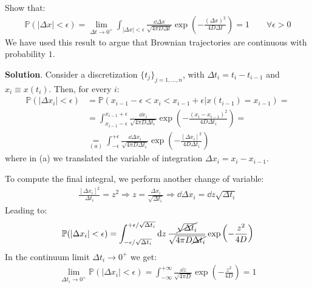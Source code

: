 \documentclass[../template.tex]{subfiles}
\begin{document}
\begin{exo}
    Show that:
    \begin{align*}
        \mathbb{P}(|\Delta x| < \epsilon) = \lim_{\Delta t \to 0^+} \int_{|\Delta x| < \epsilon } \frac{\dd{\Delta x}}{\sqrt{4 \pi D \Delta t }} \exp\left(-\frac{(\Delta x)^2}{4D \Delta t} \right)=1 \qquad \forall \epsilon> 0 
    \end{align*}
    We have used this result to argue that Brownian trajectories are continuous with probability $1$.

    \medskip

    \textbf{Solution}.
    Consider a discretization $\{t_j\}_{j=1,\dots,n}$, with $\Delta t_i = t_i - t_{i-1}$ and $x_i \equiv x(t_i)$. Then, for every $i$:
    \begin{align*}
        \mathbb{P}(|\Delta x_i| < \epsilon) &= \mathbb{P}(x_{i-1} - \epsilon < x_i < x_{i-1}+\epsilon|x(t_{i-1}) = x_{i-1}) =\\
        &= \int_{x_{i-1} - \epsilon}^{x_{i-1} + \epsilon} \frac{\dd{x_i}}{\sqrt{4 \pi D \Delta t_i}}  \exp\left(-\frac{(x_i - x_{i-1})^2}{4D \Delta t_i} \right) =\\
        &\underset{(a)}{=}  \int_{-\epsilon}^{+\epsilon} \frac{\dd{\Delta x_i}}{\sqrt{4 \pi D \Delta t_i}}  \exp\left(-\frac{[\Delta x_i]^2}{4 D \Delta t_i} \right) 
    \end{align*}
    where in (a) we translated the variable of integration $\Delta x_i = x_i - x_{i-1}$.

    To compute the final integral, we perform another change of variable:
    \begin{align*}
        \frac{[\Delta x_i]^2}{\Delta t_i} = z^2 \Rightarrow z = \frac{\Delta x_i }{\sqrt{ \Delta t_i}}    \Rightarrow \dd{\Delta x_i} = \dd{z} \sqrt{\Delta t_i}
    \end{align*} 
    Leading to:
    \begin{align*}
        \mathbb{P}(|\Delta x_i| < \epsilon) = \int_{-\epsilon/\sqrt{\Delta t_i}}^{+\epsilon/\sqrt{\Delta t_i}} \dd{z} \frac{\cancel{\sqrt{\Delta t_i}}}{\sqrt{4 \pi D \cancel{\Delta t_i}}} \exp\left(-\frac{z^2}{4D} \right) 
    \end{align*}
    In the continuum limit $\Delta t_i \to 0^+$ we get:
    \begin{align*}
        \lim_{\Delta t_i \to 0^+} \mathbb{P}(|\Delta x_i| < \epsilon) = \int_{-\infty}^{+\infty} \frac{\dd{z}}{\sqrt{4 \pi D}}  \exp\left(-\frac{z^2}{4 D} \right) = 1
    \end{align*}
\end{exo}
\end{document}
